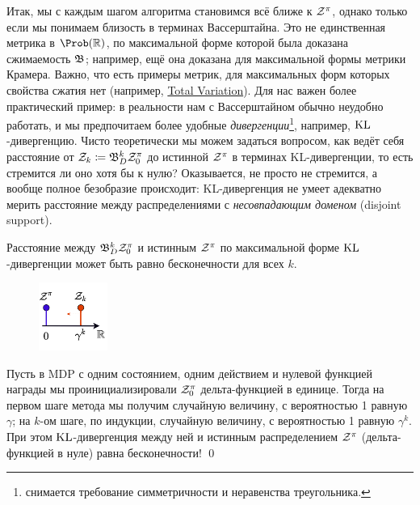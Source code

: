 Итак, мы с каждым шагом алгоритма становимся всё ближе к $\mathcal{Z}^\pi$, однако только если мы понимаем близость в терминах Вассерштайна. Это не единственная метрика в $\Prob ( \R )$, по максимальной форме которой была доказана сжимаемость $\mathfrak{B}$; например, ещё она доказана для максимальной формы метрики Крамера. Важно, что есть примеры метрик, для максимальных форм которых свойства сжатия нет (например, \href{https://en.wikipedia.org/wiki/Total_variation_distance_of_probability_measures}{Total Variation}). Для нас важен более практический пример: в реальности нам с Вассерштайном обычно неудобно работать, и мы предпочитаем более удобные \emph{дивергенции}\footnote{снимается требование симметричности и неравенства треугольника.}, например, $\operatorname{KL}$-дивергенцию. Чисто теоретически мы можем задаться вопросом, как ведёт себя расстояние от $\Z_k \HM\coloneqq \B_D^k \Z^\pi_0$ до истинной $\mathcal{Z}^{\pi}$ в терминах KL-дивергенции, то есть стремится ли оно хотя бы к нулю? Оказывается, не просто не стремится, а вообще полное безобразие происходит: KL-дивергенция не умеет адекватно мерить расстояние между распределениями с \emph{несовпадающим доменом} (disjoint support).

\begin{theorem}
Расстояние между $\mathfrak{B}_D^k \mathcal{Z}^\pi_0$ и истинным $\mathcal{Z}^\pi$ по максимальной форме $\operatorname{KL}$-дивергенции может быть равно бесконечности для всех $k$.

\begin{figure}
\vspace{-1cm}
\centering
\includegraphics[width=0.2\textwidth]{Images/KLdivProblem.png}
\vspace{-0.5cm}
\end{figure}
\beginproof
Пусть в MDP с одним состоянием, одним действием и нулевой функцией награды мы проинициализировали $\mathcal{Z}^\pi_0$ дельта-функцией в единице. Тогда на первом шаге метода мы получим случайную величину, с вероятностью 1 равную $\gamma$; на $k$-ом шаге, по индукции, случайную величину, с вероятностью 1 равную $\gamma^k$. При этом $\operatorname{KL}$-дивергенция между ней и истинным распределением $\mathcal{Z}^\pi$ (дельта-функцией в нуле) равна бесконечности! \qed
\end{theorem}

